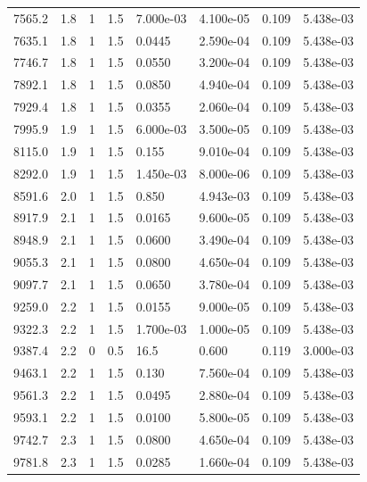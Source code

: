 \documentclass[preview]{standalone}
\begin{document}
{{{\begin{tabular}{L{1.2cm}C{1.2cm} C{0.3cm}C{0.5cm} C{1.4cm}C{1.4cm} C{1.4cm}C{1.4cm}}
  7565.2  &   1.8  & 1     & 1.5 &  7.000e-03  & 4.100e-05  & 0.109 &  5.438e-03   \\ 
  7635.1  &   1.8  & 1     & 1.5 &  0.0445  & 2.590e-04  & 0.109 &  5.438e-03   \\ 
  7746.7  &   1.8  & 1     & 1.5 &  0.0550  & 3.200e-04  & 0.109 &  5.438e-03   \\ 
  7892.1  &   1.8  & 1     & 1.5 &  0.0850  & 4.940e-04  & 0.109 &  5.438e-03   \\ 
  7929.4  &   1.8  & 1     & 1.5 &  0.0355  & 2.060e-04  & 0.109 &  5.438e-03   \\ 
  7995.9  &   1.9  & 1     & 1.5 &  6.000e-03  & 3.500e-05  & 0.109 &  5.438e-03   \\ 
  8115.0  &   1.9  & 1     & 1.5 &  0.155  & 9.010e-04  & 0.109 &  5.438e-03   \\ 
  8292.0  &   1.9  & 1     & 1.5 &  1.450e-03  & 8.000e-06  & 0.109 &  5.438e-03   \\ 
  8591.6  &   2.0  & 1     & 1.5 &  0.850  & 4.943e-03  & 0.109 &  5.438e-03   \\ 
  8917.9  &   2.1  & 1     & 1.5 &  0.0165  & 9.600e-05  & 0.109 &  5.438e-03   \\ 
  8948.9  &   2.1  & 1     & 1.5 &  0.0600  & 3.490e-04  & 0.109 &  5.438e-03   \\ 
  9055.3  &   2.1  & 1     & 1.5 &  0.0800  & 4.650e-04  & 0.109 &  5.438e-03   \\ 
  9097.7  &   2.1  & 1     & 1.5 &  0.0650  & 3.780e-04  & 0.109 &  5.438e-03   \\ 
  9259.0  &   2.2  & 1     & 1.5 &  0.0155  & 9.000e-05  & 0.109 &  5.438e-03   \\ 
  9322.3  &   2.2  & 1     & 1.5 &  1.700e-03  & 1.000e-05  & 0.109 &  5.438e-03   \\ 
  9387.4  &   2.2  & 0     & 0.5 &  16.5  & 0.600  & 0.119 &  3.000e-03   \\ 
  9463.1  &   2.2  & 1     & 1.5 &  0.130  & 7.560e-04  & 0.109 &  5.438e-03   \\ 
  9561.3  &   2.2  & 1     & 1.5 &  0.0495  & 2.880e-04  & 0.109 &  5.438e-03   \\ 
  9593.1  &   2.2  & 1     & 1.5 &  0.0100  & 5.800e-05  & 0.109 &  5.438e-03   \\ 
  9742.7  &   2.3  & 1     & 1.5 &  0.0800  & 4.650e-04  & 0.109 &  5.438e-03   \\ 
  9781.8  &   2.3  & 1     & 1.5 &  0.0285  & 1.660e-04  & 0.109 &  5.438e-03   \\ 

\end{tabular}}}}
\end{document}

